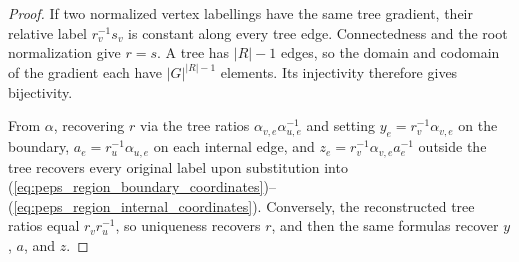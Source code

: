 \begin{proof}\leanok
    If two normalized vertex labellings have the same tree gradient,
    their relative label $r_v^{-1}s_v$ is constant along every tree edge.
    Connectedness and the root normalization give $r=s$. A tree has
    $|R|-1$ edges, so the domain and codomain of the gradient each have
    $|G|^{|R|-1}$ elements. Its injectivity therefore gives bijectivity.

    From $\alpha$, recovering $r$ via the tree ratios
    $\alpha_{v,e}\alpha_{u,e}^{-1}$ and setting
    $y_e=r_v^{-1}\alpha_{v,e}$ on the boundary,
    $a_e=r_u^{-1}\alpha_{u,e}$ on each internal edge, and
    $z_e=r_v^{-1}\alpha_{v,e}a_e^{-1}$ outside the tree
    recovers every original label upon substitution into
    (\ref{eq:peps_region_boundary_coordinates})--(\ref{eq:peps_region_internal_coordinates}).
    Conversely, the reconstructed tree
    ratios equal $r_vr_u^{-1}$, so uniqueness recovers $r$, and then
    the same formulas recover $y$, $a$, and $z$.
\end{proof}

